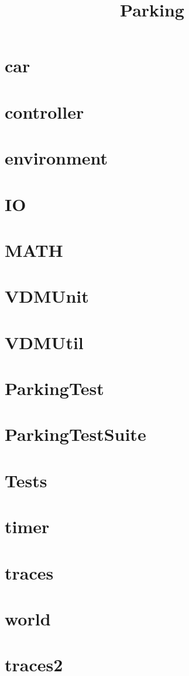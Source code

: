 \documentclass{article}
\begin{document}
\title{Parking}
\author{}
\maketitle
\tableofcontents

\section{car}


\section{controller}


\section{environment}


\section{IO}


\section{MATH}


\section{VDMUnit}


\section{VDMUtil}


\section{ParkingTest}


\section{ParkingTestSuite}


\section{Tests}


\section{timer}


\section{traces}


\section{world}


\section{traces2}

\end{document}
